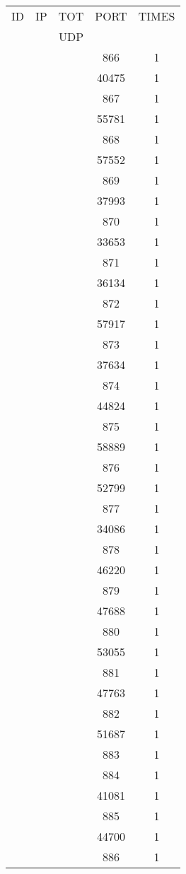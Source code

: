\documentclass[a4paper]{scrartcl}
\begin{document}
\begin{minipage}[b]{0.5\linewidth}
\begin{tabular}{| c | c | c | c | c |}
\hline
ID & IP & TOT & PORT & TIMES \\ 
   &    & UDP &      &       \\ 
\hline
& & & 866 & 1 \\ & & & 40475 & 1 \\ & & & 867 & 1 \\ & & & 55781 & 1 \\ & & & 868 & 1 \\ & & & 57552 & 1 \\ & & & 869 & 1 \\ & & & 37993 & 1 \\ & & & 870 & 1 \\ & & & 33653 & 1 \\ & & & 871 & 1 \\ & & & 36134 & 1 \\ & & & 872 & 1 \\ & & & 57917 & 1 \\ & & & 873 & 1 \\ & & & 37634 & 1 \\ & & & 874 & 1 \\ & & & 44824 & 1 \\ & & & 875 & 1 \\ & & & 58889 & 1 \\ & & & 876 & 1 \\ & & & 52799 & 1 \\ & & & 877 & 1 \\ & & & 34086 & 1 \\ & & & 878 & 1 \\ & & & 46220 & 1 \\ & & & 879 & 1 \\ & & & 47688 & 1 \\ & & & 880 & 1 \\ & & & 53055 & 1 \\ & & & 881 & 1 \\ & & & 47763 & 1 \\ & & & 882 & 1 \\ & & & 51687 & 1 \\ & & & 883 & 1 \\ & & & 884 & 1 \\ & & & 41081 & 1 \\ & & & 885 & 1 \\ & & & 44700 & 1 \\ & & & 886 & 1 \\ \hline\end{tabular}\end{minipage} \hfill\begin{minipage}[b]{0.5\linewidth}\begin{tabular}{| c | c | c | c | c |}

\end{tabular}
\end{minipage}
\end{document}
